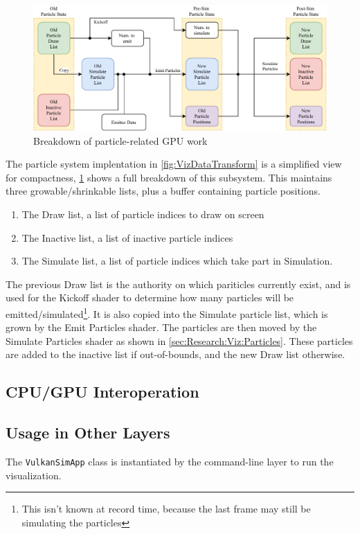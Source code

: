 \pagebreak
\begin{figure}[t]
    \centering
    \includegraphics[width=\linewidth]{Ch48Implementation/figures/FinalReport_VizData_Particles.pdf}
    \caption{Breakdown of particle-related GPU work}
    \label{fig:VizDataParticles}
\end{figure}
The particle system implentation in \cref{fig:VizDataTransform} is a simplified view for compactness, \cref{fig:VizDataParticles} shows a full breakdown of this subsystem.
This maintains three growable/shrinkable lists, plus a buffer containing particle positions.
\begin{enumerate}
    \item The Draw list, a list of particle indices to draw on screen
    \item The Inactive list, a list of inactive particle indices
    \item The Simulate list, a list of particle indices which take part in Simulation.
\end{enumerate}
The previous Draw list is the authority on which pariticles currently exist, and is used for the Kickoff shader to determine how many particles will be emitted/simulated\footnote{This isn't known at record time, because the last frame may still be simulating the particles}.
It is also copied into the Simulate particle list, which is grown by the Emit Particles shader.
The particles are then moved by the Simulate Particles shader as shown in \cref{sec:Research:Viz:Particles}.
These particles are added to the inactive list if out-of-bounds, and the new Draw list otherwise.

\subsection{CPU/GPU Interoperation}\label{sec:Impl:Viz:CPUGPUSafety}

\subsection{Usage in Other Layers}
The \texttt{VulkanSimApp} class is instantiated by the command-line layer to run the visualization.